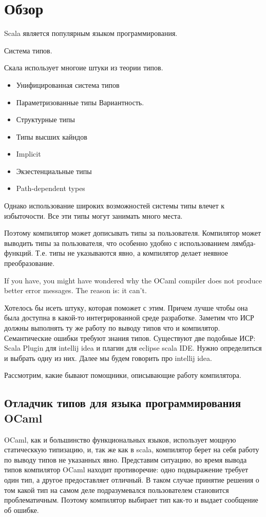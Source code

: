 \section{Обзор}

Scala является популярным языком программирования.

Система типов.

Скала использует многоие штуки из теории типов.
\begin{itemize}
  \item Унифицированная система типов
  \item Параметризованные типы
  Вариантность.
  \item Структурные типы
  \item Типы высших кайндов
  \item Implicit
  \item Экзестенциальные типы
  \item Path-dependent types
\end{itemize}

Однако использование широких возможностей системы типы влечет к избыточости.
Все эти типы могут занимать много места.

Поэтому компилятор может дописывать типы за пользователя.
Компилятор может выводить типы за пользователя, что особенно удобно с
использованием лямбда-функций.
Т.е. типы не указываются явно, а компилятор делает неявное преобразование.

If you have, you might have wondered why the OCaml compiler does not produce
better error messages. The reason is: it can't.

Хотелось бы исеть штуку, которая поможет с этим.
Причем лучше чтобы она была доступна в какой-то интегрированной среде разработке.
Заметим что ИСР должны выполнять ту же работу по выводу типов что и компилятор.
Семантические ошибки требуют знания типов.
Существуют две подобные ИСР: Scala Plugin для intellij idea и плагин для
eclipse scala IDE.
Нужно определиться и выбрать одну из них.
Далее мы будем говорить про intellij idea.

Рассмотрим, какие бывают помощники, описывающие работу компилятора.

\subsection{Отладчик типов для языка программирования OCaml}
\label{sec:ocaml}

OCaml, как и большинство функциональных языков, использует мощную статическкую
типизацию, и, так же как в scala, компилятор берет на себя работу по выводу типов
не указанных явно.
Представим ситуацию, во время вывода типов компилятор OCaml находит противоречие:
одно подвыражение требует один тип, а другое предоставляет отличный.
В таком случае принятие решения о том какой тип на самом деле подразумевался
пользователем становится проблематичным.
Поэтому компилятор выбирает тип как-то и выдает сообщение об ошибке.

